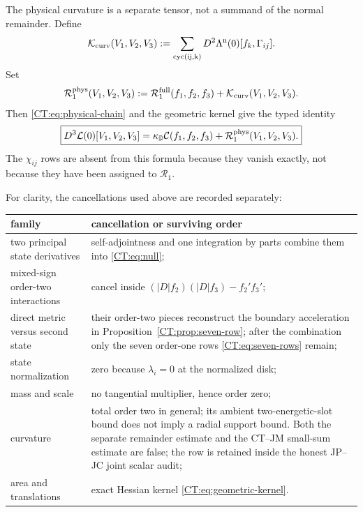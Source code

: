 \documentclass[11pt]{amsart}
\numberwithin{equation}{section}
\theoremstyle{definition}
\theoremstyle{remark}
\newcommand{\Dop}{|D|}
\newcommand{\Cnull}{\mathcal C}
\newcommand{\Rone}{\mathcal R_1}
\newcommand{\Rfull}{\mathcal R_1^{\rm full}}
\newcommand{\Rphys}{\mathcal R_1^{\rm phys}}
\begin{document}
The physical curvature is a separate tensor, not a summand of the normal
remainder.  Define
\begin{equation}\label{CT:eq:K-physical}
 \mathcal K_{\rm curv}(V_1,V_2,V_3)
 :=\sum_{\rm cyc(ij,k)}D^2\Lambda^{\rm n}(0)
     [f_k,\Gamma_{ij}].
\end{equation}
Set
\begin{equation}\label{CT:eq:Rphys}
 \Rphys(V_1,V_2,V_3)
 :=\Rfull(f_1,f_2,f_3)
   +\mathcal K_{\rm curv}(V_1,V_2,V_3).
\end{equation}
Then \eqref{CT:eq:physical-chain} and the geometric kernel give the typed
identity
\begin{equation}\label{CT:eq:physical-complete-split}
 \boxed{
 D^3\mathcal L(0)[V_1,V_2,V_3]
 =\kappa_{\mathbb D}\Cnull(f_1,f_2,f_3)
  +\Rphys(V_1,V_2,V_3).}
\end{equation}
The $\chi_{ij}$ rows are absent from this formula because they vanish
exactly, not because they have been assigned to $\Rone$.

For clarity, the cancellations used above are recorded separately:
\begin{center}
\begin{tabular}{>{\raggedright\arraybackslash}p{.27\linewidth}
                >{\raggedright\arraybackslash}p{.61\linewidth}}
\toprule
family & cancellation or surviving order\\
\midrule
two principal state derivatives & self-adjointness and one integration by
parts combine them into \eqref{CT:eq:null};\\
mixed-sign order-two interactions & cancel inside
$(\Dop f_2)(\Dop f_3)-f_2'f_3'$;\\
direct metric versus second state & their order-two pieces reconstruct the
boundary acceleration in Proposition~\ref{CT:prop:seven-row}; after the
combination only the seven order-one rows \eqref{CT:eq:seven-rows} remain;\\
state normalization & zero because $\lambda_i=0$ at the normalized disk;\\
mass and scale & no tangential multiplier, hence order zero;\\
curvature & total order two in general; its ambient two-energetic-slot bound
does not imply a radial support bound.  Both the separate remainder estimate
and the CT--JM small-sum estimate are false; the row is retained inside the
honest JP--JC joint scalar audit;\\
area and translations & exact Hessian kernel
\eqref{CT:eq:geometric-kernel}.\\
\bottomrule
\end{tabular}
\end{center}
\end{document}
